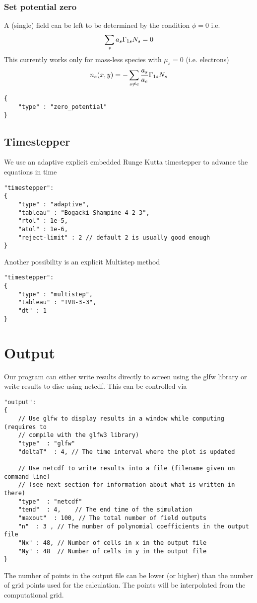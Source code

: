 \subsubsection{ Set potential zero}
A (single) field can be left to be determined by the condition $\phi = 0$ i.e.
\begin{align}
    \sum_s a_s \Gamma_{1s} {N_s}  = 0
\end{align}
This currently works only for mass-less species with $\mu_s =0$ (i.e. electrons)
\begin{align}
    n_e(x,y) = -\sum_{s\neq e} \frac{a_s}{a_e} \Gamma_{1s}{N_s} 
\end{align}
\begin{verbatim}
{
    "type" : "zero_potential"
}
\end{verbatim}
\subsection{Timestepper}
We use an adaptive explicit embedded Runge Kutta timestepper to advance the equations in time
\begin{verbatim}
"timestepper":
{
    "type" : "adaptive",
    "tableau" : "Bogacki-Shampine-4-2-3",
    "rtol" : 1e-5,
    "atol" : 1e-6,
    "reject-limit" : 2 // default 2 is usually good enough
}
\end{verbatim}
Another possibility is an explicit Multistep method
\begin{verbatim}
"timestepper":
{
    "type" : "multistep",
    "tableau" : "TVB-3-3",
    "dt" : 1
}
\end{verbatim}

\section{Output}
Our program can either write results directly to screen using the glfw library
or write results to disc using netcdf.
This can be controlled via
\begin{verbatim}
"output":
{
    // Use glfw to display results in a window while computing (requires to
    // compile with the glfw3 library)
    "type"  : "glfw"
    "deltaT"  : 4, // The time interval where the plot is updated

    // Use netcdf to write results into a file (filename given on command line)
    // (see next section for information about what is written in there)
    "type"  : "netcdf"
    "tend"  : 4,    // The end time of the simulation
    "maxout"  : 100, // The total number of field outputs
    "n"  : 3 , // The number of polynomial coefficients in the output file
    "Nx" : 48, // Number of cells in x in the output file
    "Ny" : 48  // Number of cells in y in the output file
}
\end{verbatim}
The number of points in the output file can be lower (or higher) than the number of
grid points used for the calculation. The points will be interpolated from the
computational grid.

